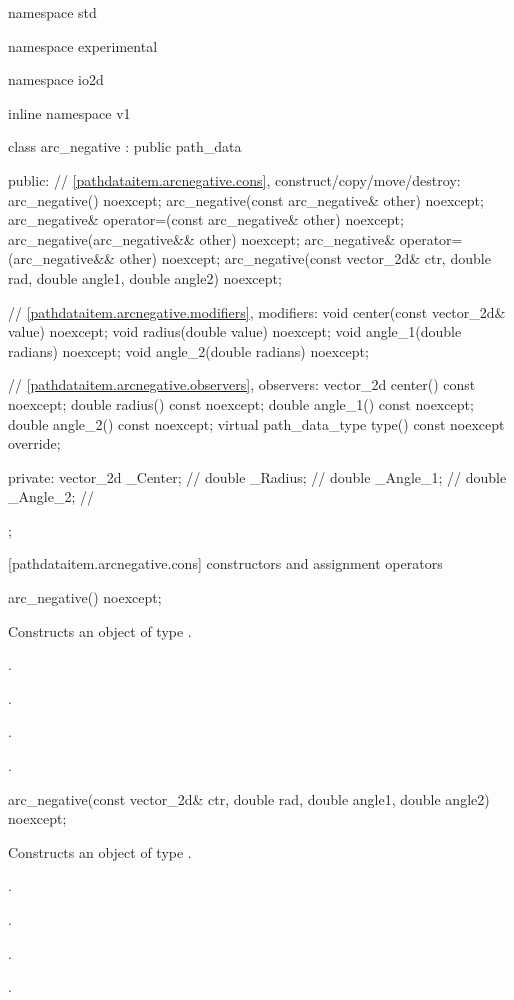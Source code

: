 \begin{codeblock}
namespace std { namespace experimental { namespace io2d { inline namespace v1 {
  class arc_negative : public path_data {
  public:
    // \ref{pathdataitem.arcnegative.cons}, construct/copy/move/destroy:
    arc_negative() noexcept;
    arc_negative(const arc_negative& other) noexcept;
    arc_negative& operator=(const arc_negative& other) noexcept;
    arc_negative(arc_negative&& other) noexcept;
    arc_negative& operator=(arc_negative&& other) noexcept;
    arc_negative(const vector_2d& ctr, double rad, double angle1,
      double angle2) noexcept;

    // \ref{pathdataitem.arcnegative.modifiers}, modifiers:
    void center(const vector_2d& value) noexcept;
    void radius(double value) noexcept;
    void angle_1(double radians) noexcept;
    void angle_2(double radians) noexcept;

    // \ref{pathdataitem.arcnegative.observers}, observers:
    vector_2d center() const noexcept;
    double radius() const noexcept;
    double angle_1() const noexcept;
    double angle_2() const noexcept;
    virtual path_data_type type() const noexcept override;

  private:
    vector_2d _Center;   // \expos
    double _Radius;  // \expos
    double _Angle_1; // \expos
    double _Angle_2; // \expos
  };
} } } }
\end{codeblock}

 [pathdataitem.arcnegative.cons] { constructors and assignment operators}

\begin{itemdecl}
    arc_negative() noexcept;
\end{itemdecl}
\begin{itemdescr}
	\pnum
	\effects
	Constructs an object of type .
	
	\pnum
	\postconditions
	.

	.

	.

	.

\end{itemdescr}

\begin{itemdecl}
    arc_negative(const vector_2d& ctr, double rad, double angle1,
      double angle2) noexcept;
\end{itemdecl}
\begin{itemdescr}
	\pnum
	\effects
	Constructs an object of type .
	
	\pnum
	\postconditions
	.

	.

	.

	.

\end{itemdescr}

